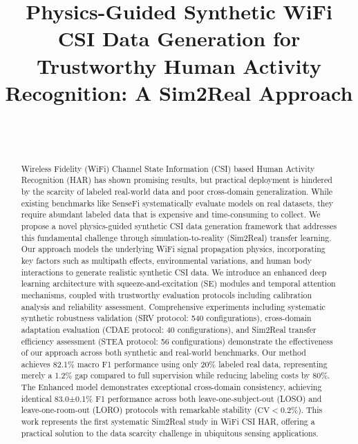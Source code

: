 \documentclass[journal]{IEEEtran}
\begin{document}
\title{Physics-Guided Synthetic WiFi CSI Data Generation for Trustworthy Human Activity Recognition: A Sim2Real Approach}

\author{ \\
\\
}

\maketitle

\begin{abstract}

Wireless Fidelity (WiFi) Channel State Information (CSI) based Human Activity Recognition (HAR) has shown promising results, but practical deployment is hindered by the scarcity of labeled real-world data and poor cross-domain generalization. While existing benchmarks like SenseFi systematically evaluate models on real datasets, they require abundant labeled data that is expensive and time-consuming to collect. We propose a novel physics-guided synthetic CSI data generation framework that addresses this fundamental challenge through simulation-to-reality (Sim2Real) transfer learning. Our approach models the underlying WiFi signal propagation physics, incorporating key factors such as multipath effects, environmental variations, and human body interactions to generate realistic synthetic CSI data. We introduce an enhanced deep learning architecture with squeeze-and-excitation (SE) modules and temporal attention mechanisms, coupled with trustworthy evaluation protocols including calibration analysis and reliability assessment. Comprehensive experiments including systematic synthetic robustness validation (SRV protocol: 540 configurations), cross-domain adaptation evaluation (CDAE protocol: 40 configurations), and Sim2Real transfer efficiency assessment (STEA protocol: 56 configurations) demonstrate the effectiveness of our approach across both synthetic and real-world benchmarks. Our method achieves 82.1\% macro F1 performance using only 20\% labeled real data, representing merely a 1.2\% gap compared to full supervision while reducing labeling costs by 80\%. The Enhanced model demonstrates exceptional cross-domain consistency, achieving identical 83.0±0.1\% F1 performance across both leave-one-subject-out (LOSO) and leave-one-room-out (LORO) protocols with remarkable stability ($\text{CV}<0.2\%$). This work represents the first systematic Sim2Real study in WiFi CSI HAR, offering a practical solution to the data scarcity challenge in ubiquitous sensing applications.
\end{abstract}
\end{document}
